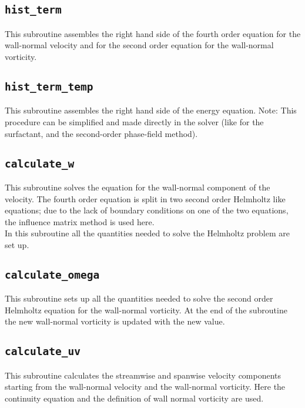 \subsection{\texttt{hist\_term}}
This subroutine assembles the right hand side of the fourth order equation for the wall-normal velocity and for the second order equation for the wall-normal vorticity.

\subsection{\texttt{hist\_term\_temp}}
This subroutine assembles the right hand side of the energy equation.
Note: This procedure can be simplified and made directly in the solver (like for the surfactant, and the second-order phase-field method).

\subsection{\texttt{calculate\_w}}
This subroutine solves the equation for the wall-normal component of the velocity. The fourth order equation is split in two second order Helmholtz like equations; due to the lack of boundary conditions on one of the two equations, the influence matrix method is used here.\\
In this subroutine all the quantities needed to solve the Helmholtz problem are set up.

\subsection{\texttt{calculate\_omega}}
This subroutine sets up all the quantities needed to solve the second order Helmholtz equation for the wall-normal vorticity. At the end of the subroutine the new wall-normal vorticity is updated with the new value.

\subsection{\texttt{calculate\_uv}}
This subroutine calculates the streamwise and spanwise velocity components starting from the wall-normal velocity and the wall-normal vorticity. Here the continuity equation and the definition of wall normal vorticity are used.

